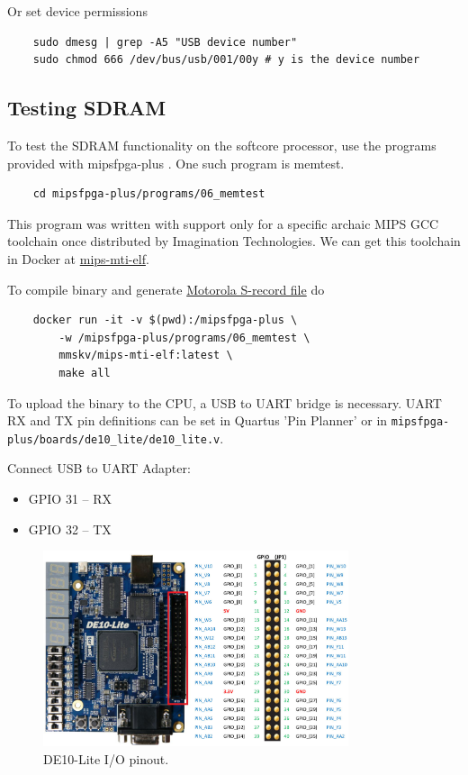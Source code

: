 \documentclass[a4paper]{article}
\let\oldtexttt\texttt
\renewcommand{\texttt}[1]{\textcolor{mygray}{\oldtexttt{#1}}}
\begin{document}
Or set device permissions

\begin{lstlisting}
    sudo dmesg | grep -A5 "USB device number"
    sudo chmod 666 /dev/bus/usb/001/00y # y is the device number
\end{lstlisting}

\subsection{Testing SDRAM}

To test the SDRAM functionality on the softcore processor, use the programs
provided with mipsfpga-plus \cite{mipsfpga_sdram}. One such program is memtest.

\begin{lstlisting}
    cd mipsfpga-plus/programs/06_memtest
\end{lstlisting}

This program was written with support only for a specific archaic MIPS GCC toolchain once distributed by Imagination Technologies.
We can get this toolchain in Docker at \href{https://hub.docker.com/repository/docker/mmskv/mips-mti-elf/general}{mips-mti-elf}.

To compile binary and generate \href{https://en.wikipedia.org/wiki/SREC_(file_format)}{Motorola S-record file} do

\begin{lstlisting}
    docker run -it -v $(pwd):/mipsfpga-plus \
        -w /mipsfpga-plus/programs/06_memtest \
        mmskv/mips-mti-elf:latest \
        make all
\end{lstlisting}

To upload the binary to the CPU, a USB to UART bridge is necessary. UART RX and
TX pin definitions can be set in Quartus 'Pin Planner' or in
\texttt{mipsfpga-plus/boards/de10\_lite/de10\_lite.v}.

Connect USB to UART Adapter:

\begin{itemize}
    \itemsep0em
    \item GPIO 31 -- RX
    \item GPIO 32 -- TX
\end{itemize}

\begin{figure}[H]
    \centering
    \includegraphics[width=0.8\textwidth]{de10lite-pinout.jpg}
    \captionsetup{width=0.8\textwidth}
    \caption{DE10-Lite I/O pinout.}
\end{figure}
\end{document}
